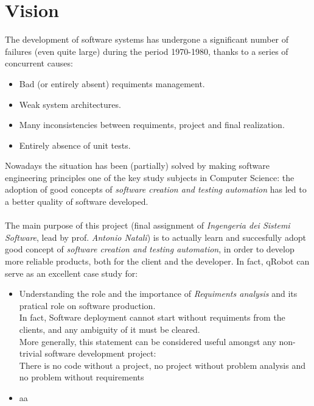 \documentclass{llncs}
\newcommand{\labelsec}[1]{\label{sec:#1}}
\begin{document}
\section{Vision}
\labelsec{Vision}
The development of software systems has undergone a significant\cite{Glass97} number of failures (even quite large) during the period 1970-1980, thanks to a series of concurrent causes:
\begin{itemize}
\item Bad (or entirely absent) requiments management.
\item Weak system architectures.
\item Many inconsistencies between requiments, project and final realization.
\item Entirely absence of unit tests. %
\end{itemize}
Nowadays the situation has been (partially) solved by making software engineering principles one of the key study subjects in Computer Science: the adoption of good concepts of \textit{software creation and testing automation} has led to a better quality of software developed.\\\\
The main purpose of this project (final assignment of \textit{Ingengeria dei Sistemi Software}, lead by prof. \textit{Antonio Natali}) is to actually learn and succesfully adopt good concept of \textit{software creation and testing automation}, in order to develop more reliable products, both for the client and the developer.
\newpage
In fact, qRobot can serve as an excellent case study for:
\begin{itemize}
\item Understanding the role and the importance of \textit{Requiments analysis} and its pratical role on software production.\\
In fact, Software deployment cannot start without requiments from the clients, and any ambiguity of it must be cleared.\\
More generally, this statement can be considered useful amongst any non-trivial software development project:\\
{
\centering
There is no code without a project, no project without problem
analysis and no problem without requirements
}
\item aa
\end{itemize}
\end{document}
